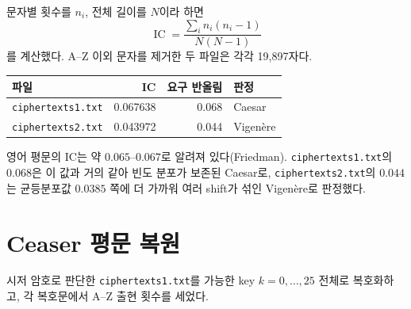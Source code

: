 \documentclass[10pt,a4paper]{article}
\begin{document}
문자별 횟수를 $n_i$, 전체 길이를 $N$이라 하면
\[
 \operatorname{IC}=\frac{\sum_i n_i(n_i-1)}{N(N-1)}
\]
를 계산했다. A--Z 이외 문자를 제거한 두 파일은 각각 19,897자다.

\begin{center}
\begin{tabular}{lrrl}
\toprule
파일 & IC & 요구 반올림 & 판정 \\
\midrule
\texttt{ciphertexts1.txt} & 0.067638 & 0.068 & Caesar \\
\texttt{ciphertexts2.txt} & 0.043972 & 0.044 & Vigenère \\
\bottomrule
\end{tabular}
\end{center}

영어 평문의 IC는 약 $0.065\text{--}0.067$로 알려져 있다(Friedman).
\texttt{ciphertexts1.txt}의 $0.068$은 이 값과 거의 같아 빈도 분포가
보존된 Caesar로, \texttt{ciphertexts2.txt}의 $0.044$는 균등분포값
$0.0385$ 쪽에 더 가까워 여러 shift가 섞인 Vigenère로 판정했다.

\section{Ceaser 평문 복원}

시저 암호로 판단한 \texttt{ciphertexts1.txt}를 가능한 key $k=0,\ldots,25$
전체로 복호화하고, 각 복호문에서 A--Z 출현 횟수를 세었다.
\end{document}
